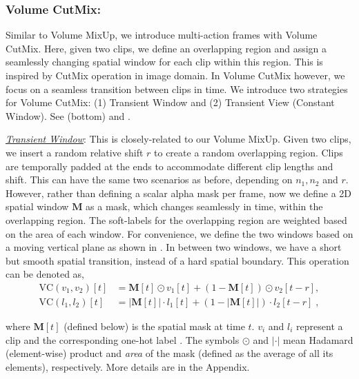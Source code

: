 \documentclass[letterpaper]{article} \usepackage{aaai23}  \usepackage{times}  \usepackage{helvet}  \usepackage{courier}  \usepackage[hyphens]{url}  \usepackage{graphicx} \urlstyle{rm} \def\UrlFont{\rm}  \usepackage{natbib}  \usepackage{caption} \frenchspacing  \setlength{\pdfpagewidth}{8.5in}  \setlength{\pdfpageheight}{11in}  \usepackage{algorithm}
\begin{document}
\subsubsection{Volume CutMix:}
\label{subsec:cm}

Similar to Volume MixUp, we introduce multi-action frames with Volume CutMix. Here, given two clips, we define an overlapping region and assign a seamlessly changing spatial window for each clip within this region. This is inspired by CutMix \cite{yun2019cutmix} operation in image domain. In Volume CutMix however, we focus on a seamless transition between clips in time. We introduce two strategies for Volume CutMix: (1) Transient Window and (2) Transient View (Constant Window). See  (bottom) and . 

\vspace{2mm}
\noindent\textit{\underline{Transient Window}}: This is closely-related to our Volume MixUp. Given two clips, we insert a random relative shift $r$ to create a random overlapping region. Clips are temporally padded at the ends to accommodate different clip lengths and shift. This can have the same two scenarios as before, depending on $n_1, n_2$ and $r$. However, rather than defining a scalar alpha mask per frame, now we define a 2D spatial window $\mathbf{M}$ as a mask, which changes seamlessly in time, within the overlapping region. The soft-labels for the overlapping region are weighted based on the area of each window. For convenience, we define the two windows based on a moving vertical plane as shown in . In between two windows, we have a short but smooth spatial transition, instead of a hard spatial boundary. This operation can be denoted as,
{\small
\begin{align*}
    \text{VC}(v_1,v_2)[t] &= \mathbf{M}[t] \odot v_1[t] + (1-\mathbf{M}[t]) \odot v_2[t-r],\\
    \text{VC}(l_1,l_2)[t] &= |\mathbf{M}[t]| \cdot l_1[t] + (1-|\mathbf{M}[t]|) \cdot l_2[t-r]\;,
\end{align*}
}

where $\mathbf{M}[t]$ (defined below) is the spatial mask at time $t$. $v_i$ and $l_i$ represent a clip and the corresponding one-hot label . The symbols $\odot$ and $|\cdot|$ mean Hadamard (element-wise) product and \textit{area} of the mask (defined as the average of all its elements), respectively. More details are in the Appendix. 
\end{document}
